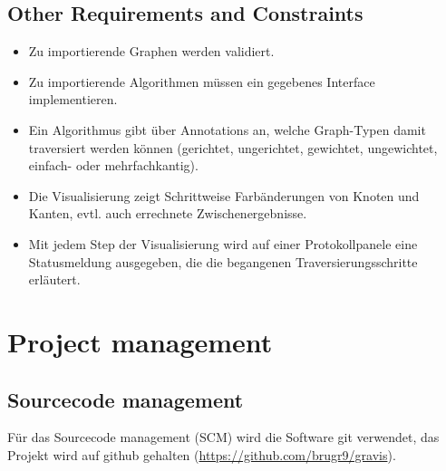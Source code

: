 \subsection{Other Requirements and Constraints}	
\label{subsec:Other Requirements and Constraints}
\begin{itemize}
  \item Zu importierende Graphen werden validiert.
  \item Zu importierende Algorithmen m\"ussen ein gegebenes Interface implementieren.
  \item Ein Algorithmus gibt \"uber Annotations an, welche Graph-Typen damit traversiert werden k\"onnen (gerichtet, ungerichtet, gewichtet, ungewichtet, einfach- oder mehrfachkantig).
  \item Die Visualisierung zeigt Schrittweise Farb\"anderungen von Knoten und Kanten, evtl. auch errechnete Zwischenergebnisse.
  \item Mit jedem Step der Visualisierung wird auf einer Protokollpanele eine Statusmeldung ausgegeben, die die begangenen Traversierungsschritte erl\"autert.
\end{itemize}
% 
\newpage
\section{Project management}
\label{sec:Project management}
% 
\subsection{Sourcecode management}
\label{subsec:Sourcecode management}
F\"ur das Sourcecode management (SCM) wird die Software git verwendet, das Projekt wird auf github gehalten (\url{https://github.com/brugr9/gravis}).
% 
